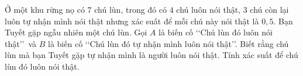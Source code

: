 \begin{bt}%
	Ở một khu rừng nọ có $7$ chú lùn, trong đó  có $4$ chú luôn nói thật, $3$ chú còn lại luôn tự nhận mình nói thật nhưng xác suất để mỗi chú này nói thật là $0{,}5$. Bạn Tuyết gặp ngẫu nhiên một chú lùn. Gọi $A$ là biến cố \lq\lq Chú lùn đó luôn nói thật\rq\rq ~và $B$ là biến cố \lq\lq Chú lùn đó tự nhận mình luôn nói thật\rq\rq . Biết rằng chú lùn mà bạn Tuyết gặp tự nhận mình là người luôn nói thật. Tính xác suất để chú lùn đó luôn nói thật.
\end{bt}

